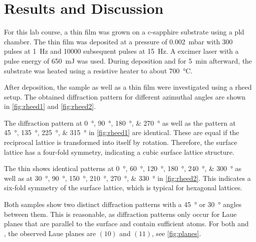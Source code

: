 \section{Results and Discussion}
For this lab course, a  thin film was grown on a c-sapphire substrate using 
a \ac{pld} chamber. 
The thin film was deposited at a pressure of \qty{0.002}{\milli\bar} with \num{300}
pulses at \qty{1}{\hertz} and \num{10000} subsequent pulses at \qty{15}{\hertz}.
A  excimer laser with a pulse energy of \qty{650}{\milli\joule} was used. 
During deposition and for \qty{5}{\minute} afterward, the substrate was heated 
using a resistive heater to about \qty{700}{\degreeCelsius}.

After deposition, the  sample as well as a  thin film were 
investigated using a \ac{rheed} setup.
The obtained diffraction pattern for different azimuthal angles are shown in 
\cref{fig:rheed1} and \cref{fig:rheed2}.

The  diffraction pattern at \qtylist{0; 90; 180; 270}{\degree} 
as well as the pattern at \qtylist{45; 135; 225; 315}{\degree} in \cref{fig:rheed1} are 
identical. 
These are equal if the reciprocal lattice is transformed into itself by rotation.
Therefore, the surface lattice has a four-fold symmetry, indicating a
cubic surface lattice structure. 

The  thin shows identical patterns at \qtylist{0;60;120;180;240;300}{\degree} 
as well as at \qtylist{30;90;150;210;270;330}{\degree} in \cref{fig:rheed2}.
This indicates a six-fold symmetry of the surface lattice, which is typical for
hexagonal lattices.

Both samples show two distinct diffraction patterns with a \qty{45}{\degree} or 
\qty{30}{\degree} angles between them.
This is reasonable, as diffraction patterns only occur for Laue planes that are 
parallel to the surface and contain sufficient atoms.
For both  and , the observed Laue planes are $(10)$ and $(11)$,
see \cref{fig:planes}.


